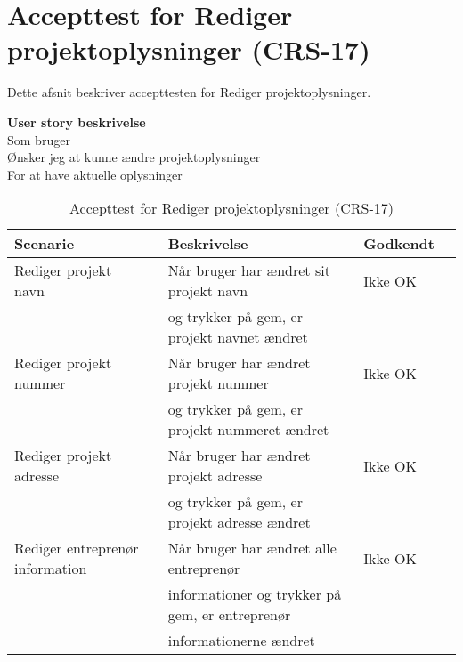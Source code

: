 \section{Accepttest for Rediger projektoplysninger (CRS-17)}
Dette afsnit beskriver accepttesten for Rediger projektoplysninger.

\textbf{User story beskrivelse} \\
Som bruger \\
Ønsker jeg at kunne ændre projektoplysninger \\
For at have aktuelle oplysninger

\begin{table}[H]
	\centering
	\begin{tabular}{|ll|l|ll|} \hline
		\textbf{Scenarie} &  & \textbf{Beskrivelse}&  \textbf{Godkendt}&  \\ \hline
		Rediger projekt navn&  &  Når bruger har ændret sit projekt navn &  Ikke OK&  \\
		& & og trykker på gem, er projekt navnet ændret& & \\ \hline
		Rediger projekt nummer&  &  Når bruger har ændret projekt nummer &  Ikke OK&  \\
		& & og trykker på gem, er projekt nummeret ændret & & \\ \hline
		Rediger projekt adresse&  &  Når bruger har ændret projekt adresse &  Ikke OK&  \\
		& & og trykker på gem, er projekt adresse ændret& & \\ \hline
		Rediger entreprenør information&  &  Når bruger har ændret alle entreprenør &  Ikke OK&  \\
		& & informationer og trykker på gem, er entreprenør& & \\
		& & informationerne ændret& & \\ \hline
	\end{tabular}
	\caption{Accepttest for Rediger projektoplysninger (CRS-17)}
	\label{AcceptRedigerProjekt}
\end{table}

\clearpage